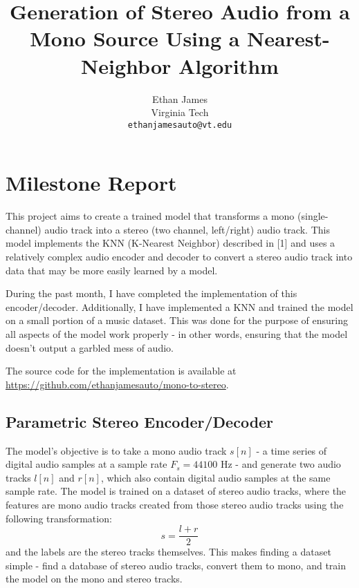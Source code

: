 \documentclass{article}
\title{Generation of Stereo Audio from a Mono Source Using
a Nearest-Neighbor Algorithm}
\author{%
  Ethan James \\
  Virginia Tech\\
  \texttt{ethanjamesauto@vt.edu} \\
}
\begin{document}
\maketitle


\section{Milestone Report}

This project aims to create a trained model that transforms a mono (single-channel) audio track into a stereo (two channel, left/right) audio track. This model implements the KNN (K-Nearest Neighbor) described in [1] and uses a relatively complex audio encoder and decoder to convert a stereo audio track into data that may be more easily learned by a model.

During the past month, I have completed the implementation of this encoder/decoder. Additionally, I have implemented a KNN and trained the model on a small portion of a music dataset. This was done for the purpose of ensuring all aspects of the model work properly - in other words, ensuring that the model doesn't output a garbled mess of audio.

The source code for the implementation is available at \url{https://github.com/ethanjamesauto/mono-to-stereo}.

\subsection{Parametric Stereo Encoder/Decoder}

The model's objective is to take a mono audio track $s[n]$ - a time series of digital audio samples at a sample rate $F_s=44100$ Hz - and generate two audio tracks $l[n]$ and $r[n]$, which also contain digital audio samples at the same sample rate. The model is trained on a dataset of stereo audio tracks, where the features are mono audio tracks created from those stereo audio tracks using the following transformation:
$$s = \frac{l+r}{2}$$
and the labels are the stereo tracks themselves. This makes finding a dataset simple - find a database of stereo audio tracks, convert them to mono, and train the model on the mono and stereo tracks.
\end{document}
